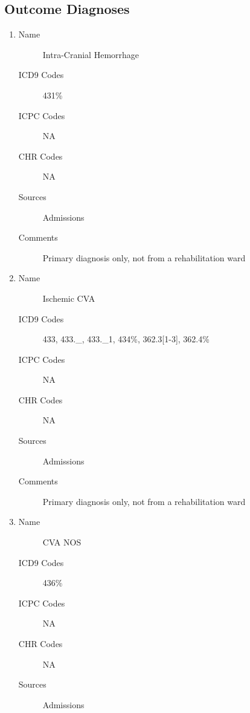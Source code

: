 \documentclass[a4paper,12pt]{article}
\begin{document}
\begin{appendices}
   			\subsection{Outcome Diagnoses}
   				\begin{enumerate}
   					\item 
		   			\begin{description}
		   				\item[Name] Intra-Cranial Hemorrhage
		   				\item[ICD9 Codes] 431\%
		   				\item[ICPC Codes] NA
		   				\item[CHR Codes] NA
		   				\item[Sources] Admissions
		   				\item[Comments] Primary diagnosis only, not from a rehabilitation ward
		   			\end{description}
	   				\item 
	   				\begin{description}
	   					\item[Name] Ischemic CVA
	   					\item[ICD9 Codes] 433, 433.\_, 433.\_1, 434\%, 362.3[1-3], 362.4\%
	   					\item[ICPC Codes] NA
	   					\item[CHR Codes] NA
	   					\item[Sources] Admissions
	   					\item[Comments] Primary diagnosis only, not from a rehabilitation ward
	   				\end{description}
   					\item 
   					\begin{description}
   						\item[Name] CVA NOS
   						\item[ICD9 Codes] 436\%
   						\item[ICPC Codes] NA
   						\item[CHR Codes] NA
   						\item[Sources] Admissions

\end{description}
\end{enumerate}
\end{appendices}
\end{document}
